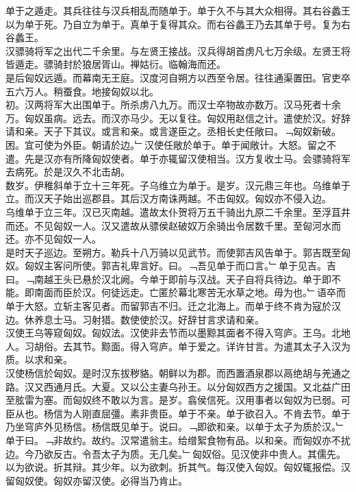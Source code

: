 \documentclass{zhvt-classic}
\begin{document}
\hspace*{2em}单于之遁走。其兵往往与汉兵相乱而随单于。单于久不与其大众相得。其右谷蠡王以为单于死。乃自立为单于。真单于复得其众。而右谷蠡王乃去其单于号。复为右谷蠡王。\\
\hspace*{2em}汉骠骑将军之出代二千余里。与左贤王接战。汉兵得胡首虏凡七万余级。左贤王将皆遁走。骠骑封於狼居胥山。禅姑衍。临翰海而还。\\
\hspace*{2em}是后匈奴远遁。而幕南无王庭。汉度河自朔方以西至令居。往往通渠置田。官吏卒五六万人。稍蚕食。地接匈奴以北。\\
\hspace*{2em}初。汉两将军大出围单于。所杀虏八九万。而汉士卒物故亦数万。汉马死者十余万。匈奴虽病。远去。而汉亦马少。无以复往。匈奴用赵信之计。遣使於汉。好辞请和亲。天子下其议。或言和亲。或言遂臣之。丞相长史任敞曰。﹁匈奴新破。困。宜可使为外臣。朝请於边。﹂汉使任敞於单于。单于闻敞计。大怒。留之不遣。先是汉亦有所降匈奴使者。单于亦辄留汉使相当。汉方复收士马。会骠骑将军去病死。於是汉久不北击胡。\\
\hspace*{2em}数岁。伊稚斜单于立十三年死。子乌维立为单于。是岁。汉元鼎三年也。乌维单于立。而汉天子始出巡郡县。其后汉方南诛两越。不击匈奴。匈奴亦不侵入边。\\
\hspace*{2em}乌维单于立三年。汉已灭南越。遣故太仆贺将万五千骑出九原二千余里。至浮苴井而还。不见匈奴一人。汉又遣故从骠侯赵破奴万余骑出令居数千里。至匈河水而还。亦不见匈奴一人。\\
\hspace*{2em}是时天子巡边。至朔方。勒兵十八万骑以见武节。而使郭吉风告单于。郭吉既至匈奴。匈奴主客问所使。郭吉礼卑言好。曰。﹁吾见单于而口言。﹂单于见吉。吉曰。﹁南越王头已悬於汉北阙。今单于即前与汉战。天子自将兵待边。单于即不能。即南面而臣於汉。何徒远走。亡匿於幕北寒苦无水草之地。毋为也。﹂语卒而单于大怒。立斩主客见者。而留郭吉不归。迁之北海上。而单于终不肯为寇於汉边。休养息士马。习射猎。数使使於汉。好辞甘言求请和亲。\\
\hspace*{2em}汉使王乌等窥匈奴。匈奴法。汉使非去节而以墨黥其面者不得入穹庐。王乌。北地人。习胡俗。去其节。黥面。得入穹庐。单于爱之。详许甘言。为遣其太子入汉为质。以求和亲。\\
\hspace*{2em}汉使杨信於匈奴。是时汉东拔秽貉。朝鲜以为郡。而西置酒泉郡以鬲绝胡与羌通之路。汉又西通月氏。大夏。又以公主妻乌孙王。以分匈奴西方之援国。又北益广田至胘雷为塞。而匈奴终不敢以为言。是岁。翕侯信死。汉用事者以匈奴为已弱。可臣从也。杨信为人刚直屈彊。素非贵臣。单于不亲。单于欲召入。不肯去节。单于乃坐穹庐外见杨信。杨信既见单于。说曰。﹁即欲和亲。以单于太子为质於汉。﹂单于曰。﹁非故约。故约。汉常遣翁主。给缯絮食物有品。以和亲。而匈奴亦不扰边。今乃欲反古。令吾太子为质。无几矣。﹂匈奴俗。见汉使非中贵人。其儒先。以为欲说。折其辩。其少年。以为欲刺。折其气。每汉使入匈奴。匈奴辄报偿。汉留匈奴使。匈奴亦留汉使。必得当乃肯止。\\
\end{document}
